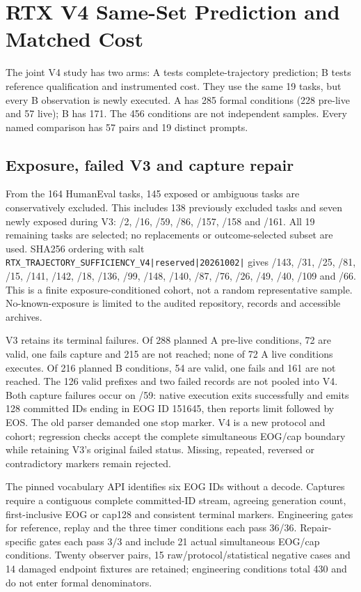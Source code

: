 \section{RTX V4 Same-Set Prediction and Matched Cost}
\label{app:rtxv4}
The joint V4 study has two arms: A tests complete-trajectory prediction; B tests reference qualification and instrumented cost. They use the same 19 tasks, but every B observation is newly executed. A has 285 formal conditions (228 pre-live and 57 live); B has 171. The 456 conditions are not independent samples. Every named comparison has 57 pairs and 19 distinct prompts.

\subsection{Exposure, failed V3 and capture repair}
From the 164 HumanEval tasks, 145 exposed or ambiguous tasks are conservatively excluded. This includes 138 previously excluded tasks and seven newly exposed during V3: /2, /16, /59, /86, /157, /158 and /161. All 19 remaining tasks are selected; no replacements or outcome-selected subset are used. SHA256 ordering with salt \nolinkurl{RTX_TRAJECTORY_SUFFICIENCY_V4|reserved|20261002|} gives /143, /31, /25, /81, /15, /141, /142, /18, /136, /99, /148, /140, /87, /76, /26, /49, /40, /109 and /66. This is a finite exposure-conditioned cohort, not a random representative sample. No-known-exposure is limited to the audited repository, records and accessible archives.

V3 retains its terminal failures. Of 288 planned A pre-live conditions, 72 are valid, one fails capture and 215 are not reached; none of 72 A live conditions executes. Of 216 planned B conditions, 54 are valid, one fails and 161 are not reached. The 126 valid prefixes and two failed records are not pooled into V4. Both capture failures occur on /59: native execution exits successfully and emits 128 committed IDs ending in EOG ID 151645, then reports limit followed by EOS. The old parser demanded one stop marker. V4 is a new protocol and cohort; regression checks accept the complete simultaneous EOG/cap boundary while retaining V3's original failed status. Missing, repeated, reversed or contradictory markers remain rejected.

The pinned vocabulary API identifies six EOG IDs without a decode. Captures require a contiguous complete committed-ID stream, agreeing generation count, first-inclusive EOG or cap128 and consistent terminal markers. Engineering gates for reference, replay and the three timer conditions each pass 36/36. Repair-specific gates each pass 3/3 and include 21 actual simultaneous EOG/cap conditions. Twenty observer pairs, 15 raw/protocol/statistical negative cases and 14 damaged endpoint fixtures are retained; engineering conditions total 430 and do not enter formal denominators.

